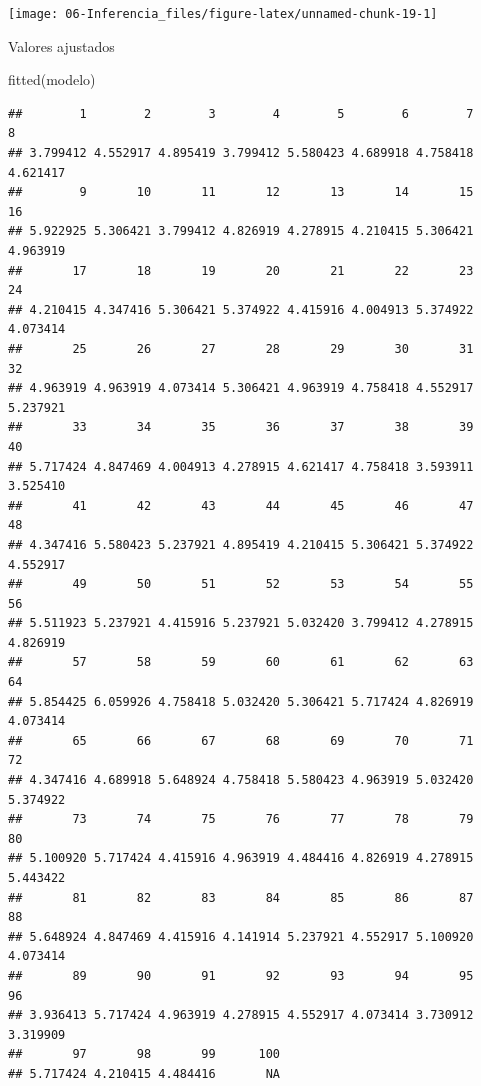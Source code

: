 \documentclass[
]{book}
\newenvironment{Shaded}{\begin{snugshade}}{\end{snugshade}}
\newcommand{\FunctionTok}[1]{\textcolor[rgb]{0.00,0.00,0.00}{#1}}
\newcommand{\NormalTok}[1]{#1}
\theoremstyle{break}
\begin{document}
\begin{center}\texttt{[image: 06-Inferencia\_files/figure-latex/unnamed-chunk-19-1]} \end{center}

Valores ajustados

\begin{Shaded}
\begin{Highlighting}[]
\FunctionTok{fitted}\NormalTok{(modelo)}
\end{Highlighting}
\end{Shaded}

\begin{verbatim}
##        1        2        3        4        5        6        7        8 
## 3.799412 4.552917 4.895419 3.799412 5.580423 4.689918 4.758418 4.621417 
##        9       10       11       12       13       14       15       16 
## 5.922925 5.306421 3.799412 4.826919 4.278915 4.210415 5.306421 4.963919 
##       17       18       19       20       21       22       23       24 
## 4.210415 4.347416 5.306421 5.374922 4.415916 4.004913 5.374922 4.073414 
##       25       26       27       28       29       30       31       32 
## 4.963919 4.963919 4.073414 5.306421 4.963919 4.758418 4.552917 5.237921 
##       33       34       35       36       37       38       39       40 
## 5.717424 4.847469 4.004913 4.278915 4.621417 4.758418 3.593911 3.525410 
##       41       42       43       44       45       46       47       48 
## 4.347416 5.580423 5.237921 4.895419 4.210415 5.306421 5.374922 4.552917 
##       49       50       51       52       53       54       55       56 
## 5.511923 5.237921 4.415916 5.237921 5.032420 3.799412 4.278915 4.826919 
##       57       58       59       60       61       62       63       64 
## 5.854425 6.059926 4.758418 5.032420 5.306421 5.717424 4.826919 4.073414 
##       65       66       67       68       69       70       71       72 
## 4.347416 4.689918 5.648924 4.758418 5.580423 4.963919 5.032420 5.374922 
##       73       74       75       76       77       78       79       80 
## 5.100920 5.717424 4.415916 4.963919 4.484416 4.826919 4.278915 5.443422 
##       81       82       83       84       85       86       87       88 
## 5.648924 4.847469 4.415916 4.141914 5.237921 4.552917 5.100920 4.073414 
##       89       90       91       92       93       94       95       96 
## 3.936413 5.717424 4.963919 4.278915 4.552917 4.073414 3.730912 3.319909 
##       97       98       99      100 
## 5.717424 4.210415 4.484416       NA
\end{verbatim}
\end{document}

